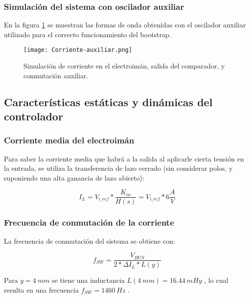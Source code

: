 \subsubsection{Simulación del sistema con oscilador auxiliar}

\noindent En la figura \ref{fig:img_corriente-auxiliar} se muestran las formas de onda obtenidas con el oscilador auxiliar utilizado para el correcto funcionamiento del bootstrap. 

\begin{figure}[H]
	\centering
	\texttt{[image: Corriente-auxiliar.png]}
	\caption{Simulación de corriente en el electroimán, salida del comparador, y conmutación auxiliar.}
	\label{fig:img_corriente-auxiliar}
\end{figure}

\subsection{Características estáticas y dinámicas del controlador}

\subsubsection{Corriente media del electroimán}

\noindent Para saber la corriente media que habrá a la salida al aplicarle cierta tensión en la entrada, se utiliza la transferencia de lazo cerrado (sin considerar polos, y suponiendo una alta ganancia de lazo abierto):

\begin{equation} 
	I_L = V_{i\_ref} * \frac{K_{in}}{H(s)} = V_{i\_ref} * 6 \frac{A}{V}
\end{equation}

\subsubsection{Frecuencia de conmutación de la corriente}

\noindent La frecuencia de conmutación del sistema se obtiene con:

\begin{equation}\label{eq_frec-sw} 
f_{SW} = \frac{V_{BUS}}{2*\Delta I_L * L(y)}
\end{equation}

\noindent Para $y = 4 \:mm $ se tiene una inductancia $L(4\:mm) = 16.44 \:mHy$ , lo cual resulta en una frecuencia $f_{SW }= 1460 \:Hz$ .

